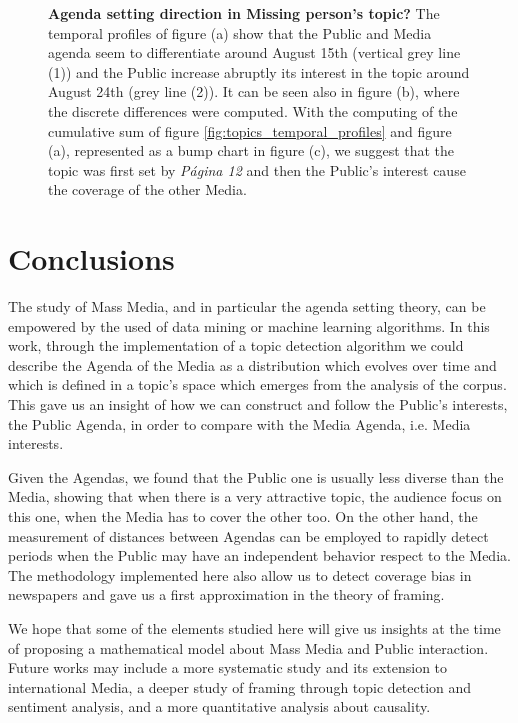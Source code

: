 \documentclass[10pt,letterpaper]{article}
\begin{document}
\begin{figure}[h!]
\caption{\textbf{Agenda setting direction in Missing person's topic?}
The temporal profiles of figure (a) show that the Public and Media agenda seem to differentiate around August 15th (vertical grey line (1)) and the Public increase abruptly its interest in the topic around August 24th (grey line (2)). It can be seen also in figure (b), where the discrete differences were computed. 
With the computing of the cumulative sum of figure \ref{fig:topics_temporal_profiles} and figure (a), represented as a bump chart in figure (c), we suggest that the topic was first set by \emph{P\'agina 12} and then the Public's interest cause the coverage of the other Media.
}
\label{fig:Maldonado_setagenda}
\end{figure}

\section*{Conclusions}

\par The study of Mass Media, and in particular the agenda setting theory, can be empowered by the used of data mining or machine learning algorithms. 
In this work, through the implementation of a topic detection algorithm we could describe the Agenda of the Media as a distribution which evolves over time and which is defined in a topic's space which emerges from the analysis of the corpus.
This gave us an insight of how we can construct and follow the Public's interests, the Public Agenda, in order to compare with the Media Agenda, i.e. Media interests. 
\par Given the Agendas, we found that the Public one is usually less diverse than the Media, showing that when there is a very attractive topic, the audience focus on this one, when the Media has to cover the other too. 
On the other hand, the measurement of distances between Agendas can be employed to rapidly detect periods when the Public may have an independent behavior respect to the Media. The methodology implemented here also allow us to detect coverage bias in newspapers and gave us a first approximation in the theory of framing. 
\par We hope that some of the elements studied here will give us insights at the time of proposing a mathematical model about Mass Media and Public interaction. Future works may include a more systematic study and its extension to international Media, a deeper study of framing through topic detection and sentiment analysis, and a more quantitative analysis about causality.
\end{document}
